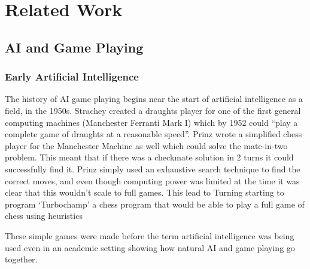 \documentclass[a4paper]{article}
\begin{document}
\section{Related Work}
\subsection{AI and Game Playing}
\subsubsection{Early Artificial Intelligence}
The history of AI game playing begins near the start of artificial intelligence as a field, in the 1950s.
Strachey created a draughts player for one of the first general computing machines (Manchester Ferranti Mark I) which by  1952 could ``play a complete game of draughts at a reasonable speed''\cite{BreifHistoryComputing}.
Prinz wrote a simplified chess player for the Manchester Machine as well which could solve the mate-in-two problem.
This meant that if there was a checkmate solution in 2 turns it could successfully find it\cite{BreifHistoryComputing}.
Prinz simply used an exhaustive search technique to find the correct moves, and even though computing power was limited at the time it was clear that this wouldn't scale to full games.
This lead to Turning starting to program `Turbochamp' a chess program that would be able to play a full game of chess using heuristics\cite{BreifHistoryComputing}
\par
These simple games were made before the term artificial intelligence was being used even in an academic setting showing how natural AI and game playing go together.
\end{document}
